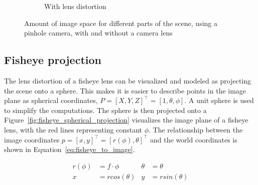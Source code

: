 \begin{figure}[!htb]
\begin{subfigure}[b]{0.45\textwidth}
    \caption{With lens distortion}
    \label{fig:wide_angle_pinhole_lens}
    \end{subfigure}
    
    \caption{Amount of image space for different parts of the scene, using a pinhole camera, with and without a camera lens}
    \label{fig:wide_angle_pinhole}
    
\end{figure}

\subsection{Fisheye projection}

The lens distortion of a fisheye lens can be visualized and modeled as projecting the scene onto a sphere. This makes it is easier to describe points in the image plane as spherical coordinates, $P = [X,Y,Z]^\top = [1, \theta,\phi]$. A unit sphere is used to simplify the computations. The sphere is then projected onto a  Figure~\ref{fig:fisheye_spherical_projection} visualizes the image plane of a fisheye lens, with the red lines representing constant $\phi$. The relationship between the image coordinates $p = [x,y]^\top = [r(\phi),\theta]^\top$ and the world coordinates is shown in Equation~\eqref{eq:fisheye_to_image}.

\begin{align}
    r(\phi) &= f \cdot \phi & \theta &= \theta \nonumber \\
    x &= rcos(\theta) & y &= rsin(\theta)
    \label{eq:fisheye_to_image}
\end{align}

